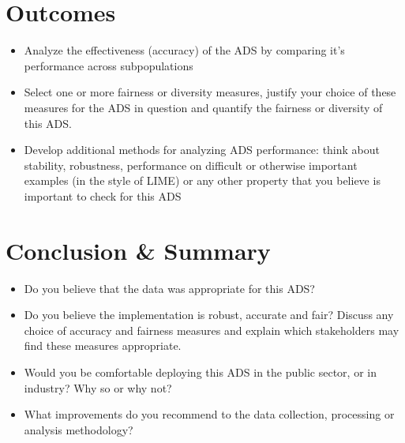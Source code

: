 \documentclass[11pt]{article}
\begin{document}
\pagebreak

\section{Outcomes}

\begin{itemize}
\item Analyze the effectiveness (accuracy) of the ADS by comparing it's performance across subpopulations
\item Select one or more fairness or diversity measures, justify your choice of these measures for the ADS in question and quantify the fairness or diversity of this ADS.
\item Develop additional methods for analyzing ADS performance: think about stability, robustness, performance on difficult or otherwise important examples (in the style of LIME) or any other property that you believe is important to check for this ADS
\end{itemize}

\pagebreak

\section{Conclusion \& Summary}
\begin{itemize}
\item Do you believe that the data was appropriate for this ADS?  
\item Do you believe the implementation is robust, accurate and fair?  Discuss any choice of accuracy and fairness measures and explain which stakeholders may find these measures appropriate.
\item Would you be comfortable deploying this ADS in the public sector, or in industry?  Why so or why not?
\item What improvements do you recommend to the data collection, processing or analysis methodology?
\end{itemize}

\end{document}
